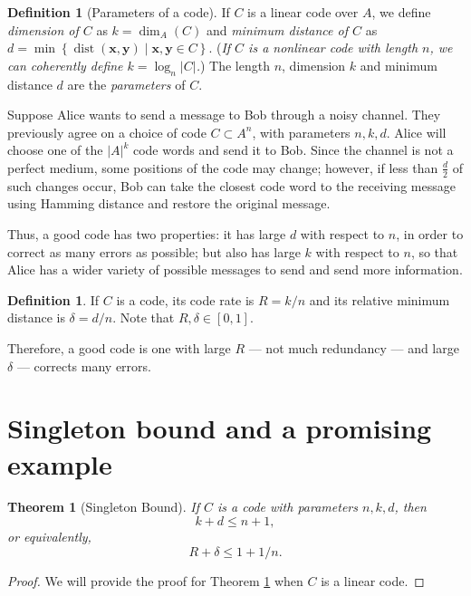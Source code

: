 \documentclass[11pt, letterpaper]{amsart}
\newtheorem{thm}[]{Theorem}
\theoremstyle{definition}
\newtheorem{defn}[]{Definition}
\DeclareMathOperator{\dist}{dist}
\begin{document}
\begin{defn}[Parameters of a code]
    If $C$ is a linear code over $A$, we define \emph{dimension of $C$} as $k = \dim_A(C)$ and \emph{minimum distance of $C$} as $d = \min\left\{\dist(\mathbf{x}, \mathbf{y}) \mid \mathbf{x}, \mathbf{y} \in C\right\}$. (\emph{If $C$ is a nonlinear code with length $n$, we can coherently define $k = \log_n{\left|C\right|}$.}) The length $n$, dimension $k$ and minimum distance $d$ are the \emph{parameters} of $C$.
\end{defn}

Suppose Alice wants to send a message to Bob through a noisy channel. They previously agree on a choice of code $C \subset A^n$, with parameters $n, k, d$. Alice will choose one of the $|A|^k$ code words and send it to Bob. Since the channel is not a perfect medium, some positions of the code may change; however, if less than $\frac{d}{2}$ of such changes occur, Bob can take the closest code word to the receiving message using Hamming distance and restore the original message.

Thus, a good code has two properties: it has large $d$ with respect to $n$, in order to correct as many errors as possible; but also has large $k$ with respect to $n$, so that Alice has a wider variety of possible messages to send and send more information.

\begin{defn}
    If $C$ is a code, its code rate is $R = k/n$ and its relative minimum distance is $\delta = d/n$. Note that $R, \delta \in [0, 1]$.
\end{defn}

Therefore, a good code is one with large $R$ --- not much redundancy --- and large $\delta$ --- corrects many errors. 

\section{Singleton bound and a promising example} \label{s:singleton}
\begin{thm}[Singleton Bound]\label{thm:singleton_bound}
If $C$ is a code with parameters $n, k, d$, then \[k + d \le n + 1,\] or equivalently, \[R + \delta \le 1 + 1/n.\]
\end{thm}

\begin{proof}
	We will provide the proof for Theorem \ref{thm:singleton_bound} when $C$ is a linear code.
\end{proof}
\end{document}
